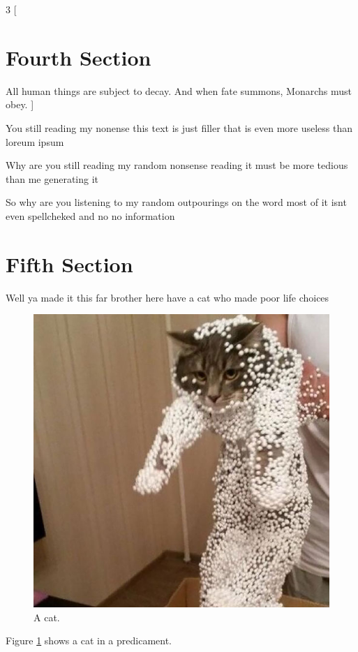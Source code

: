 \documentclass{article}
\begin{document}
\begin{multicols}{3}
[
\section{Fourth Section}
All human things are subject to decay. And when fate summons, Monarchs must obey.
]

You still reading my nonense this text is just filler that is even more useless than loreum ipsum 

\columnbreak

Why are you still reading my random nonsense reading it must be more tedious than me generating it 

So why are you listening to my random outpourings on the word most of it isnt even spellcheked and no 
no information
\end{multicols}

\section{Fifth Section}
Well ya made it this far brother here have a cat who made poor life choices

\begin{figure}[!htb]
	\includegraphics[width=\linewidth]{Images/mistake.jpg}
	\caption{A cat.}
  	\label{fig:cat}
\end{figure}

Figure \ref{fig:cat} shows a cat in a predicament.
\end{document}

